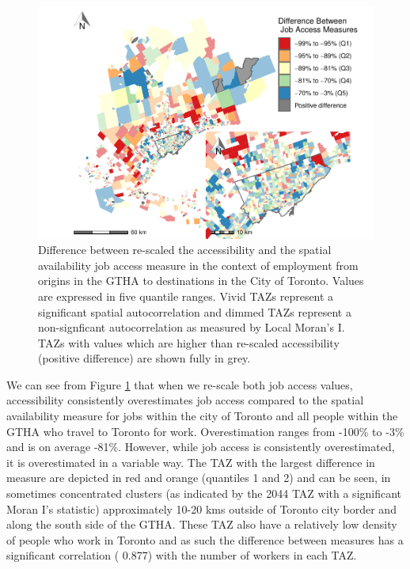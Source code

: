 \documentclass[]{elsarticle} %
\begin{document}
\begin{figure}
\includegraphics[width=1\linewidth]{Spatial-Availability_files/figure-latex/plot-local-i-Toronto-1} \caption{\label{fig:plot-local-i-Toronto}Difference between re-scaled the accessibility and the spatial availability job access measure in the context of employment from origins in the GTHA to destinations in the City of Toronto. Values are expressed in five quantile ranges. Vivid TAZs represent a significant spatial autocorrelation and dimmed TAZs represent a non-signficant autocorrelation as measured by Local Moran's I. TAZs with values which are higher than re-scaled accessibility (positive difference) are shown fully in grey.}\label{fig:plot-local-i-Toronto}
\end{figure}

We can see from Figure \ref{fig:plot-local-i-Toronto} that when we
re-scale both job access values, accessibility consistently
overestimates job access compared to the spatial availability measure
for jobs within the city of Toronto and all people within the GTHA who
travel to Toronto for work. Overestimation ranges from -100\% to -3\%
and is on average -81\%. However, while job access is consistently
overestimated, it is overestimated in a variable way. The TAZ with the
largest difference in measure are depicted in red and orange (quantiles
1 and 2) and can be seen, in sometimes concentrated clusters (as
indicated by the 2044 TAZ with a significant Moran I's statistic)
approximately 10-20 kms outside of Toronto city border and along the
south side of the GTHA. These TAZ also have a relatively low density of
people who work in Toronto and as such the difference between measures
has a significant correlation ( 0.877) with the number of workers in
each TAZ.
\end{document}
